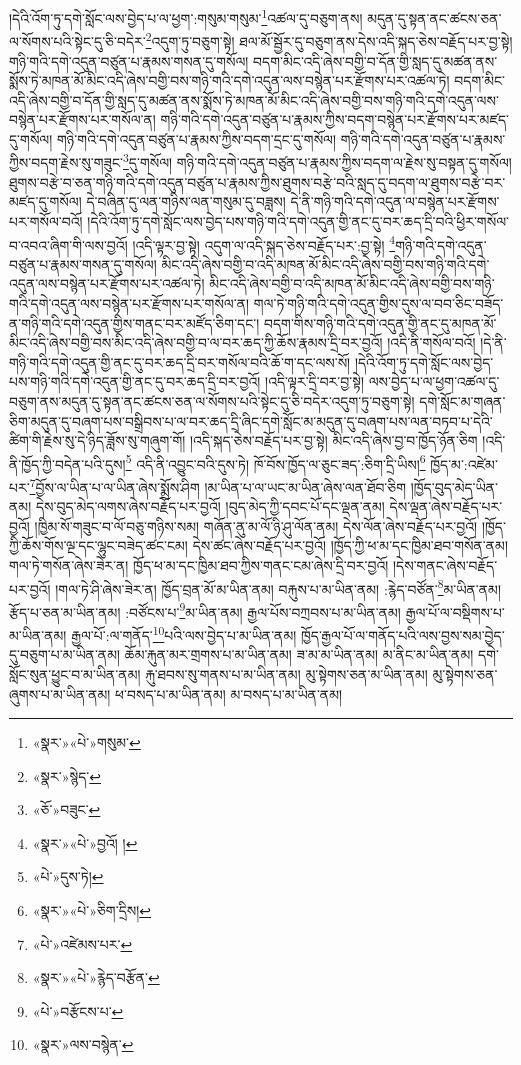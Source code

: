 །དེའི་འོག་ཏུ་དགེ་སློང་ལས་བྱེད་པ་ལ་ཕྱག་:གསུམ་གསུམ་\footnote{«སྣར་»«པེ་»གསུམ་}འཚལ་དུ་བཅུག་ནས། མདུན་དུ་སྟན་ནང་ཚངས་ཅན་ལ་སོགས་པའི་སྟེང་དུ་ཅི་བདེར་\footnote{«སྣར་»སྙེད་}འདུག་ཏུ་བཅུག་སྟེ། ཐལ་མོ་སྦྱོར་དུ་བཅུག་ནས་དེས་འདི་སྐད་ཅེས་བརྗོད་པར་བྱ་སྟེ། གཉི་གའི་དགེ་འདུན་བཙུན་པ་རྣམས་གསན་དུ་གསོལ། བདག་མིང་འདི་ཞེས་བགྱི་བ་དོན་གྱི་སླད་དུ་མཚན་ནས་སྨོས་ཏེ་མཁན་མོ་མིང་འདི་ཞེས་བགྱི་བས་གཉི་གའི་དགེ་འདུན་ལས་བསྙེན་པར་རྫོགས་པར་འཚལ་ཏེ། བདག་མིང་འདི་ཞེས་བགྱི་བ་དོན་གྱི་སླད་དུ་མཚན་ནས་སྨོས་ཏེ་མཁན་མོ་མིང་འདི་ཞེས་བགྱི་བས་གཉི་གའི་དགེ་འདུན་ལས་བསྙེན་པར་རྫོགས་པར་གསོལ་ན། གཉི་གའི་དགེ་འདུན་བཙུན་པ་རྣམས་ཀྱིས་བདག་བསྙེན་པར་རྫོགས་པར་མཛད་དུ་གསོལ། གཉི་གའི་དགེ་འདུན་བཙུན་པ་རྣམས་ཀྱིས་བདག་དྲང་དུ་གསོལ། གཉི་གའི་དགེ་འདུན་བཙུན་པ་རྣམས་ཀྱིས་བདག་རྗེས་སུ་གཟུང་\footnote{«ཅོ་»བཟུང་}དུ་གསོལ། གཉི་གའི་དགེ་འདུན་བཙུན་པ་རྣམས་ཀྱིས་བདག་ལ་རྗེས་སུ་བསྟན་དུ་གསོལ། ཐུགས་བརྩེ་བ་ཅན་གཉི་གའི་དགེ་འདུན་བཙུན་པ་རྣམས་ཀྱིས་ཐུགས་བརྩེ་བའི་སླད་དུ་བདག་ལ་ཐུགས་བརྩེ་བར་མཛད་དུ་གསོལ། དེ་བཞིན་དུ་ལན་གཉིས་ལན་གསུམ་དུ་བཟླས། དེ་ནི་གཉི་གའི་དགེ་འདུན་ལ་བསྙེན་པར་རྫོགས་པར་གསོལ་བའོ། །དེའི་འོག་ཏུ་དགེ་སློང་ལས་བྱེད་པས་གཉི་གའི་དགེ་འདུན་གྱི་ནང་དུ་བར་ཆད་དྲི་བའི་ཕྱིར་གསོལ་བ་འབའ་ཞིག་གི་ལས་བྱའོ། །འདི་ལྟར་བྱ་སྟེ། འདུག་ལ་འདི་སྐད་ཅེས་བརྗོད་པར་:བྱ་སྟེ། \footnote{«སྣར་»«པེ་»བྱའོ། ། }གཉི་གའི་དགེ་འདུན་བཙུན་པ་རྣམས་གསན་དུ་གསོལ། མིང་འདི་ཞེས་བགྱི་བ་འདི་མཁན་མོ་མིང་འདི་ཞེས་བགྱི་བས་གཉི་གའི་དགེ་འདུན་ལས་བསྙེན་པར་རྫོགས་པར་འཚལ་ཏེ། མིང་འདི་ཞེས་བགྱི་བ་འདི་མཁན་མོ་མིང་འདི་ཞེས་བགྱི་བས་གཉི་གའི་དགེ་འདུན་ལས་བསྙེན་པར་རྫོགས་པར་གསོལ་ན། གལ་ཏེ་གཉི་གའི་དགེ་འདུན་གྱིས་དུས་ལ་བབ་ཅིང་བཟོད་ན་གཉི་གའི་དགེ་འདུན་གྱིས་གནང་བར་མཛོད་ཅིག་དང་། བདག་གིས་གཉི་གའི་དགེ་འདུན་གྱི་ནང་དུ་མཁན་མོ་མིང་འདི་ཞེས་བགྱི་བས་མིང་འདི་ཞེས་བགྱི་བ་ལ་བར་ཆད་ཀྱི་ཆོས་རྣམས་དྲི་བར་བྱའོ། །འདི་ནི་གསོལ་བའོ། །དེ་ནི་གཉི་གའི་དགེ་འདུན་གྱི་ནང་དུ་བར་ཆད་དྲི་བར་གསོལ་བའི་ཆོ་ག་དང་ལས་སོ། །དེའི་འོག་ཏུ་དགེ་སློང་ལས་བྱེད་པས་གཉི་གའི་དགེ་འདུན་གྱི་ནང་དུ་བར་ཆད་དྲི་བར་བྱའོ། །འདི་ལྟར་དྲི་བར་བྱ་སྟེ། ལས་བྱེད་པ་ལ་ཕྱག་འཚལ་དུ་བཅུག་ནས་མདུན་དུ་སྟན་ནང་ཚངས་ཅན་ལ་སོགས་པའི་སྟེང་དུ་ཅི་བདེར་འདུག་ཏུ་བཅུག་སྟེ། དགེ་སློང་མ་གཞན་ཅིག་མདུན་དུ་བཞག་པས་བསྒྲིབས་པ་ལ་བར་ཆད་དྲི་ཞིང་དགེ་སློང་མ་མདུན་དུ་བཞག་པས་ལན་བཏབ་པ་དེའི་ཚིག་གི་རྗེས་སུ་དེ་ཉིད་ཟློས་སུ་གཞུག་གོ། །འདི་སྐད་ཅེས་བརྗོད་པར་བྱ་སྟེ། མིང་འདི་ཞེས་བྱ་བ་ཁྱོད་ཉོན་ཅིག །འདི་ནི་ཁྱོད་ཀྱི་བདེན་པའི་དུས།\footnote{«པེ་»དུས་ཏེ།} འདི་ནི་འབྱུང་བའི་དུས་ཏེ། ཁོ་བོས་ཁྱོད་ལ་ཅུང་ཟད་:ཅིག་དྲི་ཡིས།\footnote{«སྣར་»«པེ་»ཅིག་དྲིས།} ཁྱོད་མ་:འཛེམ་པར་\footnote{«པེ་»འཛེམས་པར་}བྱོས་ལ་ཡིན་པ་ལ་ཡིན་ཞེས་སྨྲོས་ཤིག །མ་ཡིན་པ་ལ་ཡང་མ་ཡིན་ཞེས་ལན་ཐོབ་ཅིག །ཁྱོད་བུད་མེད་ཡིན་ནམ། དེས་བུད་མེད་ལགས་ཞེས་བརྗོད་པར་བྱའོ། །བུད་མེད་ཀྱི་དབང་པོ་དང་ལྡན་ནམ། དེས་ལྡན་ཞེས་བརྗོད་པར་བྱའོ། །ཁྱིམ་སོ་གཟུང་བ་ལོ་བཅུ་གཉིས་སམ། གཞོན་ནུ་མ་ལོ་ཉི་ཤུ་ལོན་ནམ། དེས་ལོན་ཞེས་བརྗོད་པར་བྱའོ། །ཁྱོད་ཀྱི་ཆོས་གོས་ལྔ་དང་ལྷུང་བཟེད་ཚང་ངམ། དེས་ཚང་ཞེས་བརྗོད་པར་བྱའོ། །ཁྱོད་ཀྱི་ཕ་མ་དང་ཁྱིམ་ཐབ་གསོན་ནམ། གལ་ཏེ་གསོན་ཞེས་ཟེར་ན། ཁྱོད་ཕ་མ་དང་ཁྱིམ་ཐབ་ཀྱིས་གནང་ངམ་ཞེས་དྲི་བར་བྱའོ། །དེས་གནང་ཞེས་བརྗོད་པར་བྱའོ། །གལ་ཏེ་ཤི་ཞེས་ཟེར་ན། ཁྱོད་བྲན་མོ་མ་ཡིན་ནམ། བརྐུས་པ་མ་ཡིན་ནམ། :རྙེད་བཙོན་\footnote{«སྣར་»«པེ་»རྙེད་བརྩོན་}མ་ཡིན་ནམ། རྩོད་པ་ཅན་མ་ཡིན་ནམ། :བཙོངས་པ་\footnote{«པེ་»བརྩོངས་པ་}མ་ཡིན་ནམ། རྒྱལ་པོས་བཀྲབས་པ་མ་ཡིན་ནམ། རྒྱལ་པོ་ལ་བསྡིགས་པ་མ་ཡིན་ནམ། རྒྱལ་པོ་:ལ་གནོད་\footnote{«སྣར་»ལས་བསྙེན་}པའི་ལས་བྱེད་པ་མ་ཡིན་ནམ། ཁྱོད་རྒྱལ་པོ་ལ་གནོད་པའི་ལས་བྱས་སམ་བྱེད་དུ་བཅུག་པ་མ་ཡིན་ནམ། ཆོམ་རྐུན་མར་གྲགས་པ་མ་ཡིན་ནམ། ཟ་མ་མ་ཡིན་ནམ། མ་ནིང་མ་ཡིན་ནམ། དགེ་སློང་སུན་ཕྱུང་བ་མ་ཡིན་ནམ། རྐུ་ཐབས་སུ་གནས་པ་མ་ཡིན་ནམ། མུ་སྟེགས་ཅན་མ་ཡིན་ནམ། མུ་སྟེགས་ཅན་ཞུགས་པ་མ་ཡིན་ནམ། ཕ་བསད་པ་མ་ཡིན་ནམ། མ་བསད་པ་མ་ཡིན་ནམ། 